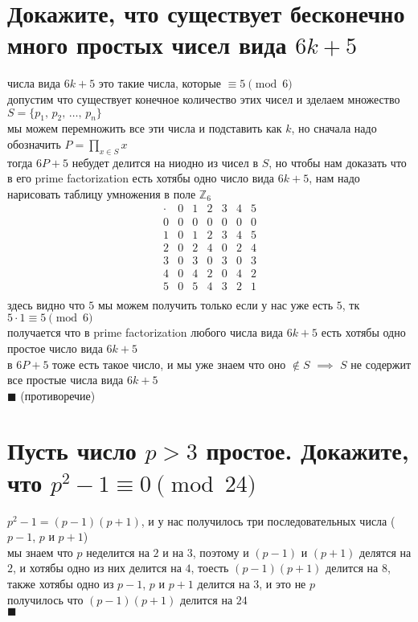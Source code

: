 \documentclass{article}
\newcommand{\ds}{\displaystyle}
\newcommand{\Mod}[1]{\pmod{#1}}
\begin{document}
  \section{Докажите, что существует бесконечно много простых чисел вида $6k + 5$}
  числа вида $6k + 5$ это такие числа, которые $\equiv 5 \Mod{6}$ \\
  допустим что существует конечное количество этих чисел и зделаем множество $S = \{p_1,\,p_2,\, \dots,\, p_n\}$ \\
  мы можем перемножить все эти числа и подставить как $k$, но сначала надо обозначить $\ds P = \prod_{x \in S} x$ \\
  тогда $6P+5$ небудет делится на ниодно из чисел в $S$,
  но чтобы нам доказать что в его prime factorization есть хотябы одно число вида $6k + 5$,
  нам надо нарисовать таблицу умножения в поле $\mathbb{Z}_6$
  $$\begin{array}{c|cccccc}
    \cdot & 0 & 1 & 2 & 3 & 4 & 5 \\
    \hline
    0 & 0 & 0 & 0 & 0 & 0 & 0 \\
    1 & 0 & 1 & 2 & 3 & 4 & 5 \\
    2 & 0 & 2 & 4 & 0 & 2 & 4 \\
    3 & 0 & 3 & 0 & 3 & 0 & 3 \\
    4 & 0 & 4 & 2 & 0 & 4 & 2 \\
    5 & 0 & 5 & 4 & 3 & 2 & 1 \\
  \end{array}$$
  здесь видно что $5$ мы можем получить только если у нас уже есть $5$, тк $5 \cdot 1 \equiv 5 \Mod{6}$ \\
  получается что в prime factorization любого числа вида $6k + 5$ есть хотябы одно простое число вида $6k + 5$ \\
  в $6P+5$ тоже есть такое число, и мы уже знаем что оно $\not\in S$ $\implies$ $S$ не содержит все простые числа вида $6k + 5$ \\
  $\blacksquare$ (противоречие)

  \section{Пусть число $p>3$ простое. Докажите, что $p^2 - 1 \equiv 0 \Mod{24}$}
  $p^2 - 1 = (p-1)(p+1)$, и у нас получилось три последовательных числа ($p-1$, $p$ и $p+1$) \\
  мы знаем что $p$ неделится на $2$ и на $3$, поэтому и $(p-1)$ и $(p+1)$ делятся на $2$, и хотябы одно из них делится на $4$,
  тоесть $(p-1)(p+1)$ делится на $8$, также хотябы одно из $p-1$, $p$ и $p+1$ делится на $3$, и это не $p$ \\
  получилось что $(p-1)(p+1)$ делится на $24$ \\
  $\blacksquare$
\end{document}
